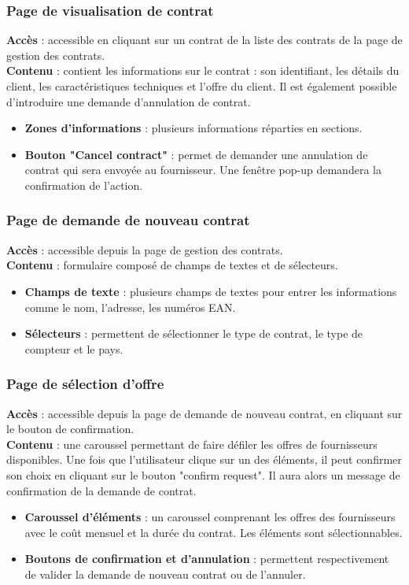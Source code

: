 \documentclass[../rapport.tex]{subfiles}
\begin{document}
\subsubsection{Page de visualisation de contrat}
\noindent \textbf{Accès} : accessible en cliquant sur un contrat de la liste des contrats de la page de gestion des contrats. \\
\textbf{Contenu} : contient les informations sur le contrat : son identifiant, les détails du client, les caractéristiques techniques et l'offre du client. Il est également possible d'introduire une demande d'annulation de contrat.
\begin{itemize}
    \item \textbf{Zones d'informations} : plusieurs informations réparties en sections. 
    \item \textbf{Bouton "Cancel contract"} : permet de demander une annulation de contrat qui sera envoyée au fournisseur. Une fenêtre pop-up demandera la confirmation de l'action. 
\end{itemize}

\subsubsection{Page de demande de nouveau contrat}
\noindent \textbf{Accès} : accessible depuis la page de gestion des contrats. \\
\textbf{Contenu} : formulaire composé de champs de textes et de sélecteurs.
\begin{itemize}
    \item \textbf{Champs de texte} : plusieurs champs de textes pour entrer les informations comme le nom, l'adresse, les numéros EAN.
    \item \textbf{Sélecteurs} : permettent de sélectionner le type de contrat, le type de compteur et le pays.
\end{itemize}

\subsubsection{Page de sélection d'offre}
\noindent \textbf{Accès} : accessible depuis la page de demande de nouveau contrat, en cliquant sur le bouton de confirmation. \\
\textbf{Contenu} : une caroussel permettant de faire défiler les offres de fournisseurs disponibles. Une fois que l'utilisateur clique sur un des éléments, il peut confirmer son choix en cliquant sur le bouton "confirm request". Il aura alors un message de confirmation de la demande de contrat.
\begin{itemize}
    \item \textbf{Caroussel d'éléments} : un caroussel comprenant les offres des fournisseurs avec le coût mensuel et la durée du contrat. Les éléments sont sélectionnables.
    \item \textbf{Boutons de confirmation et d'annulation} : permettent respectivement de valider la demande de nouveau contrat ou de l'annuler.
\end{itemize}

\newpage
\end{document}
